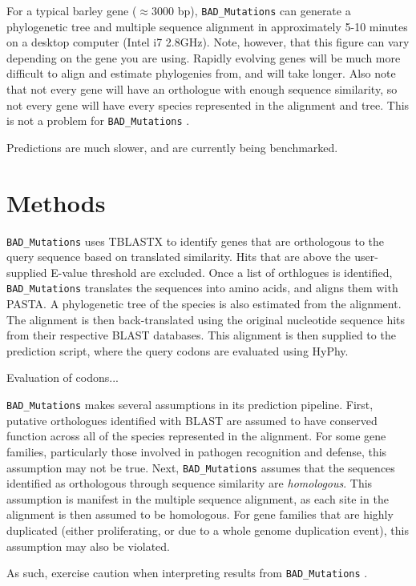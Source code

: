 \documentclass[12pt]{article}
\newcommand{\BM}{\texttt{BAD\_Mutations} }
\begin{document}
\par For a typical barley gene ($\approx$3000 bp), \BM can generate a
phylogenetic tree and multiple sequence alignment in approximately 5-10 minutes
on a desktop computer (Intel i7 2.8GHz). Note, however, that this figure can
vary depending on the gene you are using. Rapidly evolving genes will be much
more difficult to align and estimate phylogenies from, and will take longer.
Also note that not every gene will have an orthologue with enough sequence
similarity, so not every gene will have every species represented in the
alignment and tree. This is not a problem for \BM.

\par Predictions are much slower, and are currently being benchmarked.
\section*{Methods}
\par \BM uses TBLASTX to identify genes that are orthologous to the query
sequence based on translated similarity. Hits that are above the user-supplied
E-value threshold are excluded. Once a list of orthlogues is identified,
\BM translates the sequences into amino acids, and aligns them with PASTA. A
phylogenetic tree of the species is also estimated from the alignment. The
alignment is then back-translated using the original nucleotide sequence hits
from their respective BLAST databases. This alignment is then supplied to the
prediction script, where the query codons are evaluated using HyPhy.

\par Evaluation of codons...

\par \BM makes several assumptions in its prediction pipeline. First, putative
orthologues identified with BLAST are assumed to have conserved function across
all of the species represented in the alignment. For some gene families,
particularly those involved in pathogen recognition and defense, this assumption
may not be true. Next, \BM assumes that the sequences identified as orthologous
through sequence similarity are \textit{homologous}. This assumption is
manifest in the multiple sequence alignment, as each site in the alignment is
then assumed to be homologous. For gene families that are highly duplicated
(either proliferating, or due to a whole genome duplication event), this
assumption may also be violated.

\par As such, exercise caution when interpreting results from \BM.
\end{document}
